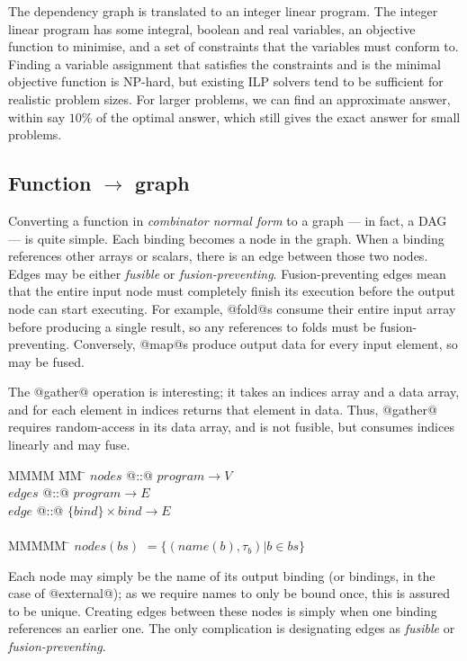 The dependency graph is translated to an integer linear program. The integer linear program has some integral, boolean and real variables, an objective function to minimise, and a set of constraints that the variables must conform to. Finding a variable assignment that satisfies the constraints and is the minimal objective function is NP-hard, but existing ILP solvers tend to be sufficient for realistic problem sizes. For larger problems, we can find an approximate answer, within say $10\%$ of the optimal answer, which still gives the exact answer for small problems.


\subsection{Function $\to$ graph}


Converting a function in \emph{combinator normal form} to a graph --- in fact, a DAG --- is quite simple.
Each binding becomes a node in the graph. When a binding references other arrays or scalars, there is an edge between those two nodes. Edges may be either \emph{fusible} or \emph{fusion-preventing}. Fusion-preventing edges mean that the entire input node must completely finish its execution before the output node can start executing. For example, @fold@s consume their entire input array before producing a single result, so any references to folds must be fusion-preventing. Conversely, @map@s produce output data for every input element, so may be fused.

The @gather@ operation is interesting; it takes an indices array and a data array, and for each element in indices returns that element in data.
Thus, @gather@ requires random-access in its data array, and is not fusible, but consumes indices linearly and may fuse.

\begin{tabbing}
MMMM        \= MM   \= \kill
$nodes$     \> @::@ \> $program \to V$          \\
$edges$     \> @::@ \> $program \to E$          \\
$edge$      \> @::@ \> $\{bind\} \times bind \to E$\\
\\
MMMMM       \= \kill
$nodes(bs)$ \> $= \{(name(b), \tau_b) | b \in bs\}$       \\
\end{tabbing}
Each node may simply be the name of its output binding (or bindings, in the case of @external@); as we require names to only be bound once, this is assured to be unique.
Creating edges between these nodes is simply when one binding references an earlier one. The only complication is designating edges as \emph{fusible} or \emph{fusion-preventing}.


